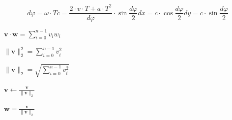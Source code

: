 \documentclass{article}
\begin{document}
\[  dφ = ω·T
  c = \frac{2·v·T + a·T^2}{dφ}·\sin\frac{dφ}{2}
  dx = c·\cos\frac{dφ}{2}
  dy = c·\sin\frac{dφ}{2}
\]
\pagebreak

$ \mathbf{v} \cdot \mathbf{w} = \sum_{i=0}^{n-1} v_i w_i $
\pagebreak

$ \|\mathbf{v}\|_2^2 = \sum_{i=0}^{n-1} v_i^2 $
\pagebreak

$ \|\mathbf{v}\|_2 = \sqrt{\sum_{i=0}^{n-1} v_i^2} $
\pagebreak

$ \mathbf{v} \leftarrow \frac{\mathbf{v}}{\|\mathbf{v}\|_2} $
\pagebreak

$ \mathbf{w} = \frac{\mathbf{v}}{\|\mathbf{v}\|_2} $
\pagebreak
\end{document}
